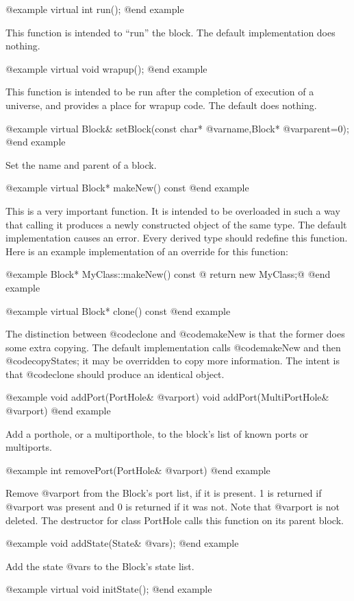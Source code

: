 @example
virtual int run();
@end example

This function is intended to ``run'' the block.  The default
implementation does nothing.

@example
virtual void wrapup();
@end example

This function is intended to be run after the completion of execution
of a universe, and provides a place for wrapup code.  The default does
nothing.

@example
virtual Block& setBlock(const char* @var{name},Block* @var{parent}=0);
@end example

Set the name and parent of a block.

@example
virtual Block* makeNew() const
@end example

This is a very important function.  It is intended to be overloaded in
such a way that calling it produces a newly constructed object of the
same type.  The default implementation causes an error.  Every derived
type should redefine this function.  Here is an example implementation
of an override for this function:

@example
Block* MyClass::makeNew() const @{ return new MyClass;@}
@end example

@example
virtual Block* clone() const
@end example

The distinction between @code{clone} and @code{makeNew} is that the
former does some extra copying.  The default implementation calls
@code{makeNew} and then @code{copyStates}; it may be overridden to
copy more information.  The intent is that @code{clone} should produce
an identical object.

@example
void addPort(PortHole& @var{port})
void addPort(MultiPortHole& @var{port})
@end example

Add a porthole, or a multiporthole, to the block's list of known ports
or multiports.

@example
int removePort(PortHole& @var{port})
@end example

Remove @var{port} from the Block's port list, if it is present.
1 is returned if @var{port} was present and 0 is returned if it
was not.  Note that @var{port} is not deleted.  The destructor
for class PortHole calls this function on its parent block.

@example
void addState(State& @var{s});
@end example

Add the state @var{s} to the Block's state list.

@example
virtual void initState();
@end example

